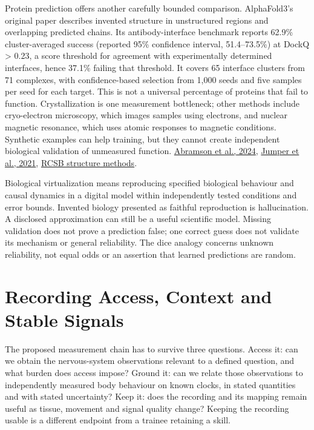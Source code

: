 Protein prediction offers another carefully bounded comparison. AlphaFold3's original paper describes invented structure in unstructured regions and overlapping predicted chains. Its antibody-interface benchmark reports 62.9\% cluster-averaged success (reported 95\% confidence interval, 51.4--73.5\%) at DockQ > 0.23, a score threshold for agreement with experimentally determined interfaces, hence 37.1\% failing that threshold. It covers 65 interface clusters from 71 complexes, with confidence-based selection from 1,000 seeds and five samples per seed for each target. This is not a universal percentage of proteins that fail to function. Crystallization is one measurement bottleneck; other methods include cryo-electron microscopy, which images samples using electrons, and nuclear magnetic resonance, which uses atomic responses to magnetic conditions. Synthetic examples can help training, but they cannot create independent biological validation of unmeasured function. \href{https://www.nature.com/articles/s41586-024-07487-w}{Abramson et al., 2024}, \href{https://www.nature.com/articles/s41586-021-03819-2}{Jumper et al., 2021}, \href{https://pdb101.rcsb.org/learn/guide-to-understanding-pdb-data/methods-for-determining-structure}{RCSB structure methods}.\par

Biological virtualization means reproducing specified biological behaviour and causal dynamics in a digital model within independently tested conditions and error bounds. Invented biology presented as faithful reproduction is hallucination. A disclosed approximation can still be a useful scientific model. Missing validation does not prove a prediction false; one correct guess does not validate its mechanism or general reliability. The dice analogy concerns unknown reliability, not equal odds or an assertion that learned predictions are random.\par

\section{Recording Access, Context and Stable Signals}

The proposed measurement chain has to survive three questions. Access it: can we obtain the nervous-system observations relevant to a defined question, and what burden does access impose? Ground it: can we relate those observations to independently measured body behaviour on known clocks, in stated quantities and with stated uncertainty? Keep it: does the recording and its mapping remain useful as tissue, movement and signal quality change? Keeping the recording usable is a different endpoint from a trainee retaining a skill.\par

